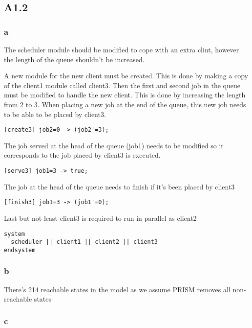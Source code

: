 \subsection{A1.2}

\subsubsection{a}

The scheduler module should be modified
to cope with an extra clint, however the length of
the queue shouldn't be increased.

A new module for the new client must be created. This is
done by making a copy of the client1 module called client3.
Then the first and second job in the queue must be modified
to handle the new client. This is done by increasing the length
from 2 to 3. When placing a new job at the end of the queue, this
new job needs to be able to be placed by client3.

\begin{verbatim}
[create3] job2=0 -> (job2'=3);
\end{verbatim}

The job served at the head of the queue (job1) needs to be modified
so it corresponds to the job placed by client3 is executed.

\begin{verbatim}
[serve3] job1=3 -> true;
\end{verbatim}

The job at the head of the queue needs to finish if it's been placed
by client3

\begin{verbatim}
[finish3] job1=3 -> (job1'=0);
\end{verbatim}

Last but not least client3 is required to run in parallel as client2

\begin{verbatim}
system
  scheduler || client1 || client2 || client3
endsystem
\end{verbatim}

\subsubsection{b}

There's 214 reachable states in the model as we assume PRISM removes all non-reachable states

\subsubsection{c}

